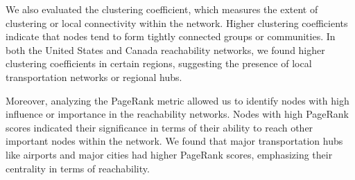 We also evaluated the clustering coefficient, which measures the extent of clustering or local connectivity within the network. Higher clustering coefficients indicate that nodes tend to form tightly connected groups or communities. In both the United States and Canada reachability networks, we found higher clustering coefficients in certain regions, suggesting the presence of local transportation networks or regional hubs.

Moreover, analyzing the PageRank metric allowed us to identify nodes with high influence or importance in the reachability networks. Nodes with high PageRank scores indicated their significance in terms of their ability to reach other important nodes within the network. We found that major transportation hubs like airports and major cities had higher PageRank scores, emphasizing their centrality in terms of reachability.
